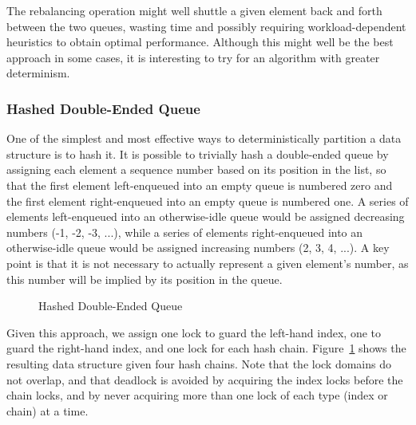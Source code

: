 The rebalancing operation might well shuttle a given element back
and forth between the two queues, wasting time and possibly requiring
workload-dependent heuristics to obtain optimal performance.
Although this might well be the best approach in some cases, it is
interesting to try for an algorithm with greater determinism.

\subsubsection{Hashed Double-Ended Queue}
\label{sec:SMPdesign:Hashed Double-Ended Queue}

One of the simplest and most effective ways to deterministically
partition a data structure is to hash it.
It is possible to trivially hash a double-ended queue by assigning
each element a sequence number based on its position in the list,
so that the first element left-enqueued into an empty queue is numbered
zero and the first element right-enqueued into an empty queue is numbered
one.
A series of elements left-enqueued into an otherwise-idle queue would
be assigned decreasing numbers (-1, -2, -3, ...), while a series of
elements right-enqueued into an otherwise-idle queue would be assigned
increasing numbers (2, 3, 4, ...).
A key point is that it is not necessary to actually represent a given
element's number, as this number will be implied by its position in
the queue.

\begin{figure}[tb]
\begin{center}
\end{center}
\caption{Hashed Double-Ended Queue}
\label{fig:SMPdesign:Hashed Double-Ended Queue}
\end{figure}

Given this approach, we assign one lock to guard the left-hand index,
one to guard the right-hand index, and one lock for each hash chain.
Figure~\ref{fig:SMPdesign:Hashed Double-Ended Queue} shows the resulting
data structure given four hash chains.
Note that the lock domains do not overlap, and that deadlock is avoided
by acquiring the index locks before the chain locks, and by never
acquiring more than one lock of each type (index or chain) at a time.

